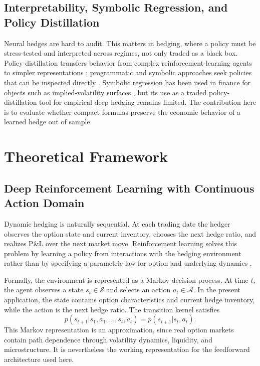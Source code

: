 \documentclass[a4paper,12pt]{article}
\numberwithin{equation}{section}
\begin{document}
\subsection{Interpretability, Symbolic Regression, and Policy Distillation}

Neural hedges are hard to audit. This matters in hedging, where a policy must be stress-tested and interpreted across regimes, not only traded as a black box. Policy distillation transfers behavior from complex reinforcement-learning agents to simpler representations \citep{rusu2016policy}; programmatic and symbolic approaches seek policies that can be inspected directly \citep{verma2018programmatically,cranmer2020discovering,makke2024interpretable}. Symbolic regression has been used in finance for objects such as implied-volatility surfaces \citep{luo2023symbolic}, but its use as a traded policy-distillation tool for empirical deep hedging remains limited. The contribution here is to evaluate whether compact formulas preserve the economic behavior of a learned hedge out of sample.

\section{Theoretical Framework}

\subsection{Deep Reinforcement Learning with Continuous Action Domain}

Dynamic hedging is naturally sequential. At each trading date the hedger observes the option state and current inventory, chooses the next hedge ratio, and realizes P\&L over the next market move. Reinforcement learning solves this problem by learning a policy from interactions with the hedging environment rather than by specifying a parametric law for option and underlying dynamics \citep{sutton2018reinforcement,franccois2018introduction}.

Formally, the environment is represented as a Markov decision process. At time $t$, the agent observes a state $s_t \in \mathcal{S}$ and selects an action $a_t \in \mathcal{A}$. In the present application, the state contains option characteristics and current hedge inventory, while the action is the next hedge ratio. The transition kernel satisfies
\begin{equation}
    p(s_{t+1}|s_1,a_1,\ldots,s_t,a_t)
    =
    p(s_{t+1}|s_t,a_t).
\end{equation}
This Markov representation is an approximation, since real option markets contain path dependence through volatility dynamics, liquidity, and microstructure. It is nevertheless the working representation for the feedforward architecture used here.
\end{document}
